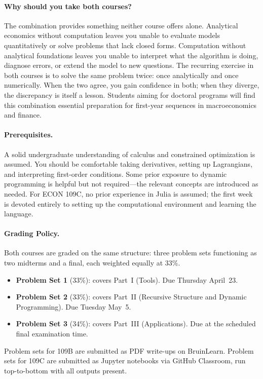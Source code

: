 \paragraph{Why should you take both courses?}
The combination provides something neither course offers alone.
Analytical economics without computation leaves you unable to evaluate models quantitatively or solve problems that lack closed forms.
Computation without analytical foundations leaves you unable to interpret what the algorithm is doing, diagnose errors, or extend the model to new questions.
The recurring exercise in both courses is to solve the same problem twice: once analytically and once numerically.
When the two agree, you gain confidence in both; when they diverge, the discrepancy is itself a lesson.
Students aiming for doctoral programs will find this combination essential preparation for first-year sequences in macroeconomics and finance.

\paragraph{Prerequisites.}
A solid undergraduate understanding of calculus and constrained optimization is assumed.
You should be comfortable taking derivatives, setting up Lagrangians, and interpreting first-order conditions.
Some prior exposure to dynamic programming is helpful but not required---the relevant concepts are introduced as needed.
For ECON 109C, no prior experience in Julia is assumed; the first week is devoted entirely to setting up the computational environment and learning the language.

\paragraph{Grading Policy.}
Both courses are graded on the same structure: three problem sets functioning as two midterms and a final, each weighted equally at 33\%.
\begin{itemize}
    \item \textbf{Problem Set 1} (33\%): covers Part~I (Tools). Due Thursday April~23.
    \item \textbf{Problem Set 2} (33\%): covers Part~II (Recursive Structure and Dynamic Programming). Due Tuesday May~5.
    \item \textbf{Problem Set 3} (34\%): covers Part~III (Applications). Due at the scheduled final examination time.
\end{itemize}
Problem sets for 109B are submitted as PDF write-ups on BruinLearn.
Problem sets for 109C are submitted as Jupyter notebooks via GitHub Classroom, run top-to-bottom with all outputs present.


